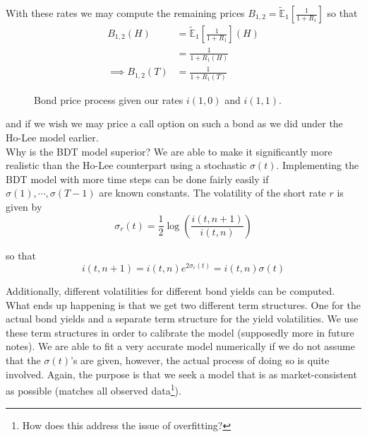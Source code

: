 \documentclass[12pt]{article}
\newlength\tindent
\renewcommand{\indent}{\hspace*{\tindent}}
\newcommand{\E}{\mathbb E}
\begin{document}
With these rates we may compute the remaining prices $B_{1,2} = \tilde{\E}_1 \left [ \frac{1}{1 + R_1} \right]$ so that
\begin{align*}
	B_{1,2}(H) &= \tilde{\E}_1 \left [ \frac{1}{1 + R_1} \right](H) \\
	&= \frac{1}{1 + R_1(H)} \\
	\implies B_{1,2}(T) &= \frac{1}{1 + R_1(T)}
\end{align*}
\begin{figure}[H]
\centering
{}
\caption{Bond price process given our rates $i(1,0)$ and $i(1,1)$.}
\end{figure}

and if we wish we may price a call option on such a bond as we did under the Ho-Lee model earlier. \\

\indent Why is the BDT model superior? We are able to make it significantly more realistic than the Ho-Lee counterpart using a stochastic $\sigma(t)$. Implementing the BDT model with more time steps can be done fairly easily if $\sigma(1),\cdots,\sigma(T - 1)$ are known constants. The volatility of the short rate $r$ is given by
\begin{equation*}
	\sigma_r(t) = \frac{1}{2} \log \left( \frac{ i(t, n + 1) }{ i(t,n) } \right)
\end{equation*}

so that
\begin{equation*}
	i(t, n + 1) = i(t,n)e^{2\sigma_r(t)} = i(t,n)\sigma(t)
\end{equation*}

\indent Additionally, different volatilities for different bond yields can be computed. What ends up happening is that we get two different term structures. One for the actual bond yields and a separate term structure for the yield volatilities. We use these term structures in order to calibrate the model (supposedly more in future notes). We are able to fit a very accurate model numerically if we do not assume that the $\sigma(t)$'s are given, however, the actual process of doing so is quite involved. Again, the purpose is that we seek a model that is as market-consistent as possible (matches all observed data\footnote{How does this address the issue of overfitting?}).
\end{document}
